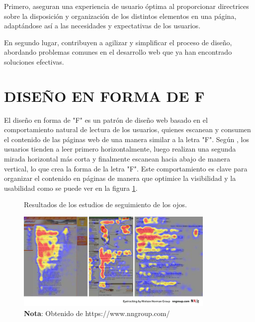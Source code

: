 		Primero, aseguran una experiencia de usuario óptima al proporcionar directrices sobre la disposición y organización de los distintos elementos en una página, adaptándose así a las necesidades y expectativas de los usuarios.
		
		En segundo lugar, contribuyen a agilizar y simplificar el proceso de diseño, abordando problemas comunes en el desarrollo web que ya han encontrado soluciones efectivas.
		
	\section{DISEÑO EN FORMA DE F}
		
		El diseño en forma de "F" es un patrón de diseño web basado en el comportamiento natural de lectura de los usuarios, quienes escanean y consumen el contenido de las páginas web de una manera similar a la letra "F". Según \textcite{nielsen2006fshaped}, los usuarios tienden a leer primero horizontalmente, luego realizan una segunda mirada horizontal más corta y finalmente escanean hacia abajo de manera vertical, lo que crea la forma de la letra "F". Este comportamiento es clave para organizar el contenido en páginas de manera que optimice la visibilidad y la usabilidad como se puede ver en la figura \ref{fig:figura2_4}.
		
		\vspace{0.3cm} %
		
		\begin{figure}[h] %
			\caption[Estudios de seguimiento ocular]
			{\newline Resultados de los estudios de seguimiento de los ojos.} %
			\vspace{0.3cm}
			\centering
			\includegraphics[width=0.85\textwidth]{imagenes/figura2_4.jpg} %
			\vspace{0.3cm}
			\caption*{\textup{\textbf{Nota}: Obtenido de https://www.nngroup.com/}}
			\vspace{-0.8cm}
			\label{fig:figura2_4} %
		\end{figure}
		
